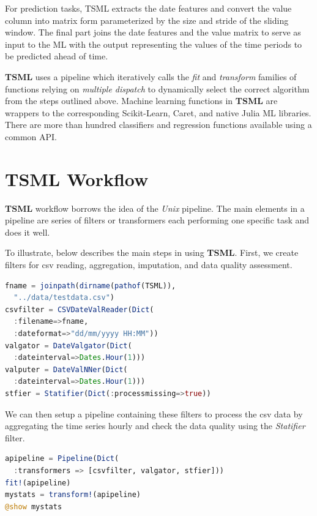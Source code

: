 \documentclass{juliacon}
\begin{document}
\vskip 6pt

For prediction tasks, TSML extracts the date features and 
convert the value column into matrix form parameterized by 
the size and stride of the sliding window. The final part joins
 the date features and the value matrix to serve as input to the 
 ML with the output representing the values of the time periods 
 to be predicted ahead of time.
 
 \vskip 6pt
 
\textbf{TSML} uses a pipeline which iteratively calls the \emph{fit} and \emph{transform}
families of functions relying on \emph{multiple dispatch} to dynamically select the correct algorithm from the steps outlined above. Machine learning functions in 
\textbf{TSML} are wrappers to the corresponding Scikit-Learn, Caret, and native Julia ML libraries. 
There are more than hundred classifiers and regression functions available using a common API.

\section{TSML Workflow}
\label{sec:tsmlworkflow}
%
\textbf{TSML} workflow borrows the idea of the  \emph{Unix} pipeline\cite{orchestra2014, combineml2016}. The main elements in a pipeline are series of filters or transformers each performing one specific task and does it well. 

\vskip 6pt
To illustrate, below describes the main steps in using \textbf{TSML}.
First, we create filters for csv reading, aggregation, imputation, and data quality
assessment.

\begin{lstlisting}[language = Julia]
fname = joinpath(dirname(pathof(TSML)),
  "../data/testdata.csv")
csvfilter = CSVDateValReader(Dict(
  :filename=>fname,
  :dateformat=>"dd/mm/yyyy HH:MM"))
valgator = DateValgator(Dict(
  :dateinterval=>Dates.Hour(1)))
valputer = DateValNNer(Dict(
  :dateinterval=>Dates.Hour(1)))
stfier = Statifier(Dict(:processmissing=>true))
\end{lstlisting}

We can then setup a pipeline containing these filters to process the csv data
by aggregating the time series hourly and check the data quality using the
\emph{Statifier} filter.

\begin{lstlisting}[language = Julia]
apipeline = Pipeline(Dict(
  :transformers => [csvfilter, valgator, stfier]))
fit!(apipeline)
mystats = transform!(apipeline)
@show mystats
\end{lstlisting}
\end{document}
